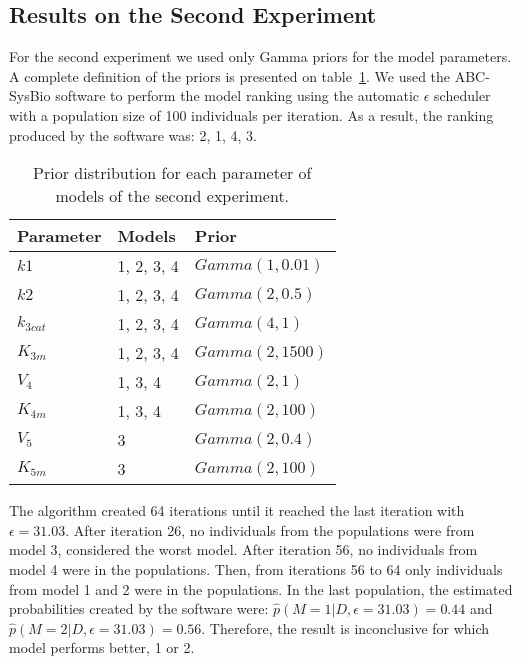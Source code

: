\subsection{Results on the Second Experiment}
For the second experiment we used only Gamma priors for the model 
parameters. A complete definition of the priors is presented on 
table~\ref{tab:smallest_priors}. We used the ABC-SysBio software to 
perform the model ranking using the automatic $\epsilon$ scheduler with 
a population size of 100 individuals per iteration. As a result, the
ranking produced by the software was: 2, 1, 4, 3. 

\begin{table}[h]
\centering
\begin{tabular}{l l l}
Parameter   & Models     & Prior             \\ \hline
\hline
$k1$        & 1, 2, 3, 4 & $Gamma (1, 0.01)$ \\
$k2$        & 1, 2, 3, 4 & $Gamma (2, 0.5)$  \\
$k_{3cat}$  & 1, 2, 3, 4 & $Gamma (4, 1)$    \\
$K_{3m}$    & 1, 2, 3, 4 & $Gamma (2, 1500)$ \\
$V_4$       & 1, 3, 4    & $Gamma (2, 1)$    \\
$K_{4m}$    & 1, 3, 4    & $Gamma (2, 100)$  \\
$V_5$       & 3          & $Gamma (2, 0.4)$  \\
$K_{5m}$    & 3          & $Gamma (2, 100)$  \\ \hline
\end{tabular}
\caption{Prior distribution for each parameter of models of the second 
    experiment.}
\label{tab:smallest_priors}
\end{table}

The algorithm created 64 iterations until it reached the last iteration
with $\epsilon = 31.03$. After iteration 26, no individuals from the 
populations were from model 3, considered the worst model. After 
iteration 56, no individuals from model 4 were in the populations. Then,
from iterations 56 to 64 only individuals from model 1 and 2 were in 
the populations. In the last population, the estimated probabilities
created by the software were: 
$\hat{p} (M = 1 | D, \epsilon = 31.03) = 0.44$ and 
$\hat{p} (M = 2 | D, \epsilon = 31.03) = 0.56$. Therefore, the result
is inconclusive for which model performs better, 1 or 2. 


